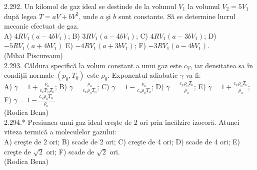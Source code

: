 \documentclass[10pt]{article}
\begin{document}
2.292. Un kilomol de gaz ideal se destinde de la volumul $V_{1}$ la volumul $V_{2}=5 V_{1}$ după legea $T=a V+b V^{2}$, unde $a$ şi $b$ sunt constante. Să se determine lucrul mecanic efectuat de gaz.\\ A) $4 R V_{1}\left(a-4 b V_{1}\right)$; B) $3 R V_{1}\left(a-4 b V_{1}\right)$; C) $4 R V_{1}\left(a-3 b V_{1}\right)$; D) $-5 R V_{1}\left(a+4 b V_{1}\right)$ E) $-4 R V_{1}\left(a+3 b V_{1}\right)$; F) $-3 R V_{1}\left(a-4 b V_{1}\right)$.\\ (Mihai Piscureanu)\\

2.293. Căldura specifică la volum constant a unui gaz este $c_{V}$, iar densitatea sa în condiții normale $\left(p_{0}, T_{0}\right)$ este $\rho_{0}$. Exponentul adiabatic $\gamma$ va fi:\\ A) $\gamma=1+\frac{p_{0}}{c_{V} \mathrm{P}_{0} T_{0}}$; B) $\gamma=\frac{p_{0}}{c_{V} \rho_{0} T_{0}}$; C) $\gamma=1-\frac{p_{0}}{c_{V} \rho_{0} T_{0}}$; D) $\gamma=\frac{c_{V} \rho_{0} T_{0}}{\rho_{0}}$; E) $\gamma=1+\frac{c_{V} \rho_{0} T_{0}}{\rho_{0}}$; F) $\gamma=1-\frac{c_{V} \rho_{0} T_{0}}{\rho_{0}}$.\\ (Rodica Bena)\\

2.294.* Presiunea unui gaz ideal creşte de 2 ori prin încălzire izocoră. Atunci viteza termică a moleculelor gazului:\\ A) creşte de 2 ori; B) scade de 2 ori; C) creşte de 4 ori; D) scade de 4 ori; E) creşte de $\sqrt{2}$ ori; F) scade de $\sqrt{2}$ ori.\\ (Rodica Bena)\\
\end{document}
